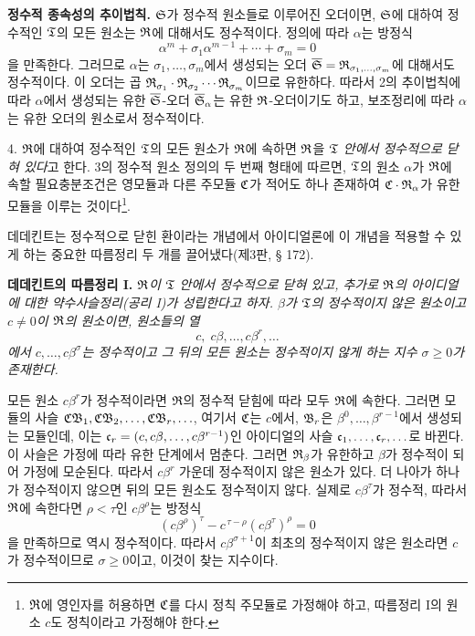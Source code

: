 \medskip
\noindent\textbf{정수적 종속성의 추이법칙.} \(\mathfrak S\)가 정수적 원소들로 이루어진 오더이면, \(\mathfrak S\)에 대하여 정수적인 \(\mathfrak{T}\)의 모든 원소는 \(\mathfrak{R}\)에 대해서도 정수적이다. 정의에 따라 \(\alpha\)는 방정식
\[
        \alpha^m+\sigma_1\alpha^{m-1}+\cdots+\sigma_m=0
\]
을 만족한다. 그러므로 \(\alpha\)는 \(\sigma_1,\ldots,\sigma_m\)에서 생성되는 오더 \(\overline{\mathfrak S}=\mathfrak{R}_{\sigma_1,\ldots,\sigma_m}\)에 대해서도 정수적이다. 이 오더는 곱 \(\mathfrak{R}_{\sigma_1}\cdot\mathfrak{R}_{\sigma_2}\cdots\mathfrak{R}_{\sigma_m}\)이므로 유한하다. 따라서 2의 추이법칙에 따라 \(\alpha\)에서 생성되는 유한 \(\overline{\mathfrak S}\)-오더 \(\overline{\mathfrak S}_\alpha\)는 유한 \(\mathfrak{R}\)-오더이기도 하고, 보조정리에 따라 \(\alpha\)는 유한 오더의 원소로서 정수적이다.

4. \(\mathfrak{R}\)에 대하여 정수적인 \(\mathfrak{T}\)의 모든 원소가 \(\mathfrak{R}\)에 속하면 \(\mathfrak{R}\)을 \emph{\(\mathfrak{T}\) 안에서 정수적으로 닫혀 있다}고 한다. 3의 정수적 원소 정의의 두 번째 형태에 따르면, \(\mathfrak{T}\)의 원소 \(\alpha\)가 \(\mathfrak{R}\)에 속할 필요충분조건은 영모듈과 다른 주모듈 \(\mathfrak{C}\)가 적어도 하나 존재하여 \(\mathfrak{C}\cdot\mathfrak{R}_\alpha\)가 유한 모듈을 이루는 것이다\footnote{\(\mathfrak{R}\)에 영인자를 허용하면 \(\mathfrak{C}\)를 다시 정칙 주모듈로 가정해야 하고, 따름정리 I의 원소 \(c\)도 정칙이라고 가정해야 한다.}.

데데킨트는 정수적으로 닫힌 환이라는 개념에서 아이디얼론에 이 개념을 적용할 수 있게 하는 중요한 따름정리 두 개를 끌어냈다(제3판, § 172).

\medskip
\noindent\textbf{데데킨트의 따름정리 I.} \emph{\(\mathfrak{R}\)이 \(\mathfrak{T}\) 안에서 정수적으로 닫혀 있고, 추가로 \(\mathfrak{R}\)의 아이디얼에 대한 약수사슬정리(공리 I)가 성립한다고 하자. \(\beta\)가 \(\mathfrak{T}\)의 정수적이지 않은 원소이고 \(c\ne0\)이 \(\mathfrak{R}\)의 원소이면, 원소들의 열
\[
        c,\;c\beta,\ldots,c\beta^r,\ldots
\]
에서 \(c,\ldots,c\beta^\sigma\)는 정수적이고 그 뒤의 모든 원소는 정수적이지 않게 하는 지수 \(\sigma\ge0\)가 존재한다.}

모든 원소 \(c\beta^r\)가 정수적이라면 \(\mathfrak{R}\)의 정수적 닫힘에 따라 모두 \(\mathfrak{R}\)에 속한다. 그러면 모듈의 사슬 \(\mathfrak{C}\mathfrak B_1,\mathfrak{C}\mathfrak B_2,\ldots,\mathfrak{C}\mathfrak B_r,\ldots\), 여기서 \(\mathfrak{C}\)는 \(c\)에서, \(\mathfrak B_r\)은 \(\beta^0,\ldots,\beta^{r-1}\)에서 생성되는 모듈인데, 이는 \(\mathfrak{c}_r=(c,c\beta,\ldots,c\beta^{r-1})\)인 아이디얼의 사슬 \(\mathfrak{c}_1,\ldots,\mathfrak{c}_r,\ldots\)로 바뀐다. 이 사슬은 가정에 따라 유한 단계에서 멈춘다. 그러면 \(\mathfrak{R}_\beta\)가 유한하고 \(\beta\)가 정수적이 되어 가정에 모순된다. 따라서 \(c\beta^r\) 가운데 정수적이지 않은 원소가 있다. 더 나아가 하나가 정수적이지 않으면 뒤의 모든 원소도 정수적이지 않다. 실제로 \(c\beta^\tau\)가 정수적, 따라서 \(\mathfrak{R}\)에 속한다면 \(\rho<\tau\)인 \(c\beta^\rho\)는 방정식
\[
        (c\beta^\rho)^\tau-c^{\,\tau-\rho}(c\beta^\tau)^\rho=0
\]
을 만족하므로 역시 정수적이다. 따라서 \(c\beta^{\sigma+1}\)이 최초의 정수적이지 않은 원소라면 \(c\)가 정수적이므로 \(\sigma\ge0\)이고, 이것이 찾는 지수이다.


